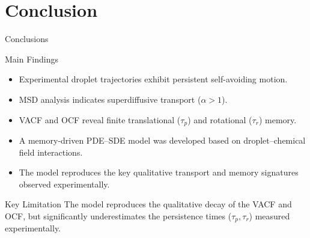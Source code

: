\section{Conclusion}
\begin{frame}{Conclusions}

	\begin{block}{Main Findings}
		\begin{itemize}
			\item Experimental droplet trajectories exhibit persistent self-avoiding motion.

			\item MSD analysis indicates superdiffusive transport
			      ($\alpha > 1$).

			\item VACF and OCF reveal finite translational
			      ($\tau_p$) and rotational ($\tau_r$) memory.

			\item A memory-driven PDE--SDE model was developed
			      based on droplet--chemical field interactions.

			\item The model reproduces the key qualitative
			      transport and memory signatures observed experimentally.
		\end{itemize}
	\end{block}

	\begin{alertblock}{Key Limitation}
		The model reproduces the qualitative decay of the VACF and OCF,
		but significantly underestimates the persistence times
		($\tau_p,\tau_r$) measured experimentally.
	\end{alertblock}

\end{frame}





